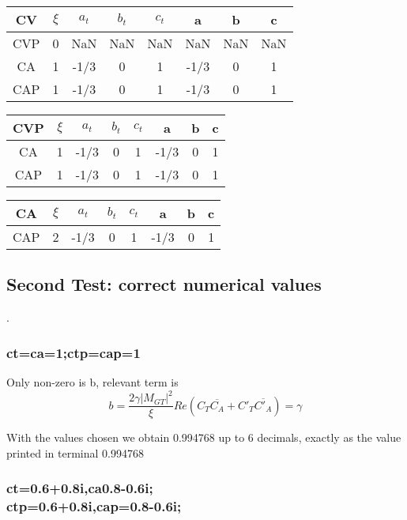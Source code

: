 \documentclass[twocolumn]{article}
\begin{document}
\begin{table}[H]
	\begin{tabular}{|c|c|c|c|c|c|c|c|}
		\hline
		CV & $\xi $& $a_t$ & $b_t$ & $c_t$ & a & b & c \\
		\hline
		CVP &  0 &  NaN & NaN  &  NaN  &  NaN & NaN  &  NaN  \\
		\hline
		CA & 1 & -1/3  & 0  & 1  & -1/3  &  0 & 1 \\
		\hline
		CAP & 1 & -1/3  & 0  & 1  & -1/3  & 0  &  1\\
		\hline
	\end{tabular}
\end{table}


\begin{table}[H]
	\begin{tabular}{|c|c|c|c|c|c|c|c|}
		\hline
		CVP & $\xi $& $a_t$ & $b_t$ & $c_t$ & a & b & c \\
		\hline
		CA & 1 & -1/3  & 0  & 1  & -1/3  & 0  & 1\\
		\hline
		CAP & 1 & -1/3  & 0  & 1 & -1/3  & 0  & 1\\
		\hline
	\end{tabular}
\end{table}

\begin{table}[H]
	\begin{tabular}{|c|c|c|c|c|c|c|c|}
		\hline
		CA & $\xi $& $a_t$ & $b_t$ & $c_t$ & a & b & c \\
		\hline
		CAP & 2 &  -1/3 & 0  & 1  & -1/3  & 0  & 1  \\
		\hline
	\end{tabular}
\end{table}

\subsection{Second Test: correct numerical values}.

\subsubsection{ct=ca=1;ctp=cap=1}

Only non-zero is b, relevant term is 
$$b = \frac{2\gamma|M_{GT}|^2}{\xi}Re(C_T\overline{C_A}+C'_T\overline{C'_A}) = \gamma$$

With the values chosen we obtain 0.994768 up to 6 decimals, exactly as the value printed in terminal  0.994768

\subsubsection{ct=0.6+0.8i,ca0.8-0.6i;\\ctp=0.6+0.8i,cap=0.8-0.6i;}
\end{document}
